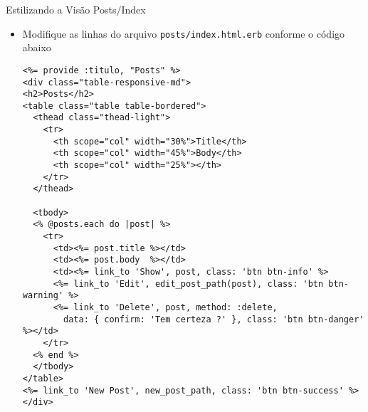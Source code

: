 \begin{frame}{Estilizando a Visão Posts$/$Index}
    \begin{itemize}
      \item Modifique as linhas do arquivo \verb|posts/index.html.erb| conforme o código abaixo
      \begin{lstlisting}[style=RubyInputStyle, basicstyle=\tiny\ttfamily, caption=app/views/posts/index.html.erb]
<%= provide :titulo, "Posts" %>
<div class="table-responsive-md">
<h2>Posts</h2>
<table class="table table-bordered">
  <thead class="thead-light">
    <tr>
      <th scope="col" width="30%">Title</th>
      <th scope="col" width="45%">Body</th>
      <th scope="col" width="25%"></th>
    </tr>
  </thead>

  <tbody>
  <% @posts.each do |post| %>
    <tr>
      <td><%= post.title %></td>
      <td><%= post.body  %></td>
      <td><%= link_to 'Show', post, class: 'btn btn-info' %>
      <%= link_to 'Edit', edit_post_path(post), class: 'btn btn-warning' %>
      <%= link_to 'Delete', post, method: :delete, 
        data: { confirm: 'Tem certeza ?' }, class: 'btn btn-danger' %></td>
    </tr>
  <% end %>
  </tbody>
</table>	
<%= link_to 'New Post', new_post_path, class: 'btn btn-success' %>
</div>      
    \end{lstlisting}
  \end{itemize}
\end{frame} 